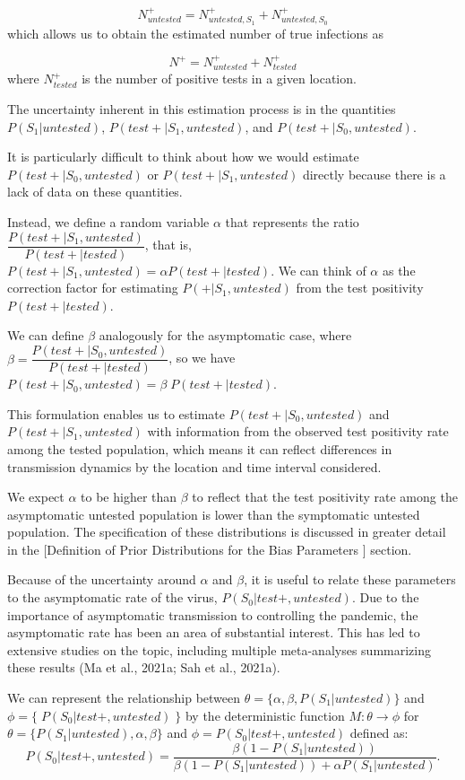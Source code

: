 \documentclass[12pt,twoside]{smiththesis}
\begin{document}
\[N^+_{untested} = N^+_{untested,S_1} + N^+_{untested,S_0}\]
which allows us to obtain the estimated number of true infections as

\[N^+ = N^+_{untested} +N^+_{tested}\]
where \(N^+_{tested}\) is the number of positive tests in a given location.

The uncertainty inherent in this estimation process is in the quantities \(P(S_1|untested)\), \(P(test + | S_1,untested)\), and \(P(test + | S_0,untested)\).

It is particularly difficult to think about how we would estimate \(P(test + | S_0,untested)\) or \(P(test + | S_1,untested)\) directly because there is a lack of data on these quantities.

Instead, we define a random variable \(\alpha\) that represents the ratio \(\dfrac{P(test + |S_1, untested)}{P(test + | tested)}\), that is, \(P(test + |S_1, untested) = \alpha P(test+|tested)\). We can think of \(\alpha\) as the correction factor for estimating \(P(+|S_1,untested)\) from the test positivity \(P(test + |tested)\).

We can define \(\beta\) analogously for the asymptomatic case, where \(\beta = \dfrac{P(test + |S_0, untested)}{P(test + | tested)}\), so we have \(P(test + |S_0, untested) = \beta \; P(test + | tested)\).

This formulation enables us to estimate \(P(test + |S_0, untested)\) and \(P(test + |S_1, untested)\) with information from the observed test positivity rate among the tested population, which means it can reflect differences in transmission dynamics by the location and time interval considered.

We expect \(\alpha\) to be higher than \(\beta\) to reflect that the test positivity rate among the asymptomatic untested population is lower than the symptomatic untested population. The specification of these distributions is discussed in greater detail in the {[}Definition of Prior Distributions for the Bias Parameters {]} section.

Because of the uncertainty around \(\alpha\) and \(\beta\), it is useful to relate these parameters to the asymptomatic rate of the virus, \(P(S_0|test +, untested)\). Due to the importance of asymptomatic transmission to controlling the pandemic, the asymptomatic rate has been an area of substantial interest. This has led to extensive studies on the topic, including multiple meta-analyses summarizing these results (Ma et al., 2021a; Sah et al., 2021a).

We can represent the relationship between \(\theta = \{ \alpha, \beta, P(S_1|untested)\}\) and \(\phi = \{\; P(S_0|test+, untested)\;\}\) by the deterministic function
\(M: \theta \to \phi\) for \(\theta = \{P(S_1|untested), \alpha, \beta \}\) and \(\phi = P(S_0|test +,untested)\) defined as:
\[P(S_0|test+, untested) = \dfrac{\beta(1 - P(S_1|untested))}{\beta(1-P(S_1|untested)) + \alpha P(S_1|untested)}.\]
\end{document}
